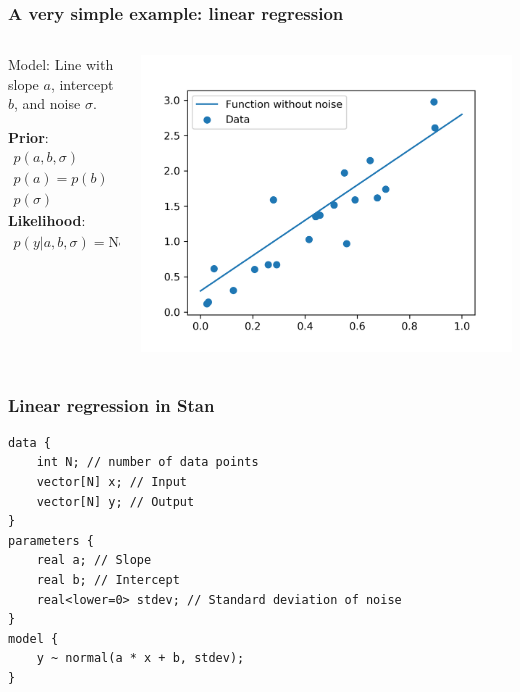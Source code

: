 \documentclass{beamer}
\begin{document}
\begin{frame}
\frametitle{A very simple example: linear regression}
\begin{columns}
\begin{column}{0.5\textwidth}
	Model: Line with slope $a$, intercept $b$, and noise $\sigma$.

	\textbf{Prior}:
	\begin{align*}
		p(a, b, \sigma) & = p(a)p(b)p(\sigma) \\
		p(a) = p(b) & = \textrm{Uniform}(-\infty, +\infty) \\
		p(\sigma) & = \textrm{Uniform}(0, +\infty)
	\end{align*}
	\textbf{Likelihood}:
	\begin{align*}
		p(y | a, b, \sigma) = \textrm{Normal}(ax + b, \sigma^2)	
	\end{align*}
\end{column}
\begin{column}{0.5\textwidth}	
\includegraphics[width=\textwidth]{lin_reg_data}	
\end{column}
\end{columns}
\end{frame}

\begin{frame}[fragile]
\frametitle{Linear regression in Stan}
\begin{verbatim}
data {
    int N; // number of data points
    vector[N] x; // Input
    vector[N] y; // Output
}
parameters {
    real a; // Slope
    real b; // Intercept
    real<lower=0> stdev; // Standard deviation of noise
}
model {
    y ~ normal(a * x + b, stdev);
}
\end{verbatim}
\end{frame}
\end{document}
